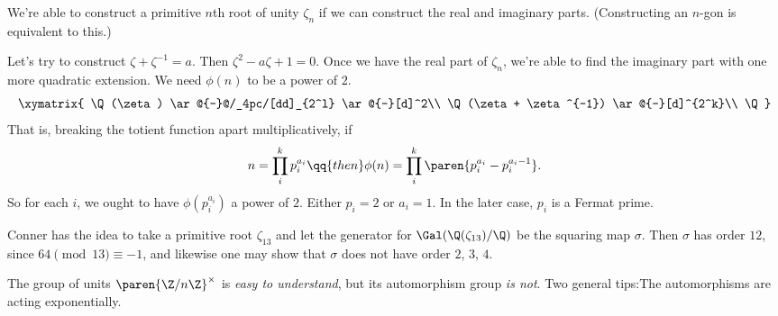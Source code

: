 \begin{ex}
   We're able to construct a primitive $n$th root of unity $\zeta_n$ if we can construct the real and imaginary parts. (Constructing an $n$-gon is equivalent to this.) 

   Let's try to construct $\zeta + \zeta^{-1} = a$. Then $\zeta^2 - a \zeta + 1 = 0$. Once we have the real part of $\zeta_n$, we're able to find the imaginary part with one more quadratic extension. We need $\phi(n)$ to be a power of $2$.
    \begin{equation*}
        \xymatrix{
        \Q(\zeta) \ar@{-}@/_4pc/[dd]_{2^l} \ar@{-}[d]^2\\
        \Q(\zeta + \zeta^{-1}) \ar@{-}[d]^{2^k}\\ 
        \Q
        }
    \end{equation*}
    That is, breaking the totient function apart multiplicatively, if
    \begin{equation*}
        n = \prod_i^k p_i^{a_i} \qq{then} \phi(n) = \prod_i^k \paren{p_i^{a_i} - p_i^{a_i-1}}.
    \end{equation*}
    So for each $i$, we ought to have $\phi(p_i^{a_i})$ a power of $2$. Either $p_i = 2$ or $a_i = 1$. In the later case, $p_i$ is a Fermat prime.
\end{ex}

\begin{ex}
    Conner has the idea to take a primitive root $\zeta_{13}$ and let the generator for $\Gal(\Q(\zeta_{13})/\Q)$ be the squaring map $\sigma$. Then $\sigma$ has order $12$, since $64 \pmod{13} \equiv -1$, and likewise one may show that $\sigma$ does not have order $2$, $3$, $4$.
\end{ex}

\begin{note}[]
    The group of units $\paren{\Z/n\Z}^\times$ is \emph{easy to understand}, but its automorphism group \emph{is not}. Two general tips:The automorphisms are acting exponentially.
\end{note}


